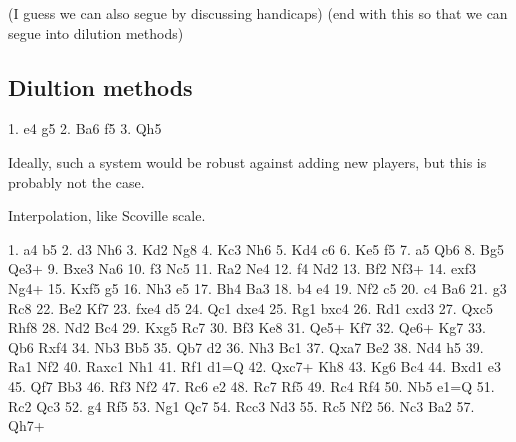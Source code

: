 \documentclass[10pt,preprint,twocolumn]{acmart}
\begin{document}
(I guess we can also segue by discussing handicaps)
(end with this so that we can segue into dilution methods)

\subsection{Diultion methods}
1. e4 g5 2. Ba6 f5 3. Qh5



Ideally, such a system would be robust against adding new players,
but this is probably not the case.


% 

Interpolation, like Scoville scale.


1. a4 b5 2. d3 Nh6 3. Kd2 Ng8 4. Kc3 Nh6
5. Kd4 c6 6. Ke5 f5 7. a5 Qb6 8. Bg5 Qe3+
9. Bxe3 Na6 10. f3 Nc5 11. Ra2 Ne4 12. f4 Nd2
13. Bf2 Nf3+ 14. exf3 Ng4+ 15. Kxf5 g5 16. Nh3 e5
17. Bh4 Ba3 18. b4 e4 19. Nf2 c5 20. c4 Ba6
21. g3 Rc8 22. Be2 Kf7 23. fxe4 d5 24. Qc1 dxe4
25. Rg1 bxc4 26. Rd1 cxd3 27. Qxc5 Rhf8 28. Nd2 Bc4
29. Kxg5 Rc7 30. Bf3 Ke8 31. Qe5+ Kf7 32. Qe6+ Kg7
33. Qb6 Rxf4 34. Nb3 Bb5 35. Qb7 d2 36. Nh3 Bc1
37. Qxa7 Be2 38. Nd4 h5 39. Ra1 Nf2 40. Raxc1 Nh1
41. Rf1 d1=Q 42. Qxc7+ Kh8 43. Kg6 Bc4 44. Bxd1 e3
45. Qf7 Bb3 46. Rf3 Nf2 47. Rc6 e2 48. Rc7 Rf5
49. Rc4 Rf4 50. Nb5 e1=Q 51. Rc2 Qc3 52. g4 Rf5
53. Ng1 Qc7 54. Rcc3 Nd3 55. Rc5 Nf2 56. Nc3 Ba2
57. Qh7+




\end{document}
